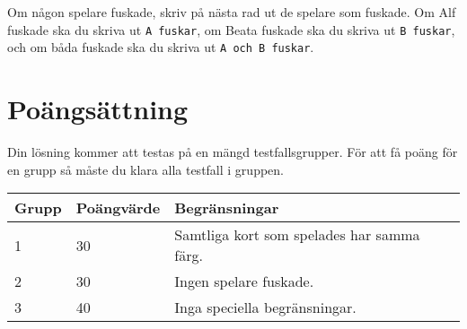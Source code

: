 Om någon spelare fuskade, skriv på nästa rad ut de spelare som fuskade.
Om Alf fuskade ska du skriva ut \texttt{A fuskar},
om Beata fuskade ska du skriva ut \texttt{B fuskar},
och om båda fuskade ska du skriva ut \texttt{A och B fuskar}.

\section*{Poängsättning}
Din lösning kommer att testas på en mängd testfallsgrupper. För att få poäng för en grupp så måste du klara alla testfall i gruppen.

\begin{tabular}{|l|l|l|}
\hline
Grupp & Poängvärde & Begränsningar \\ \hline
1     & 30         & Samtliga kort som spelades har samma färg. \\ \hline
2     & 30         & Ingen spelare fuskade. \\ \hline
3     & 40         & Inga speciella begränsningar. \\ \hline
\end{tabular}
